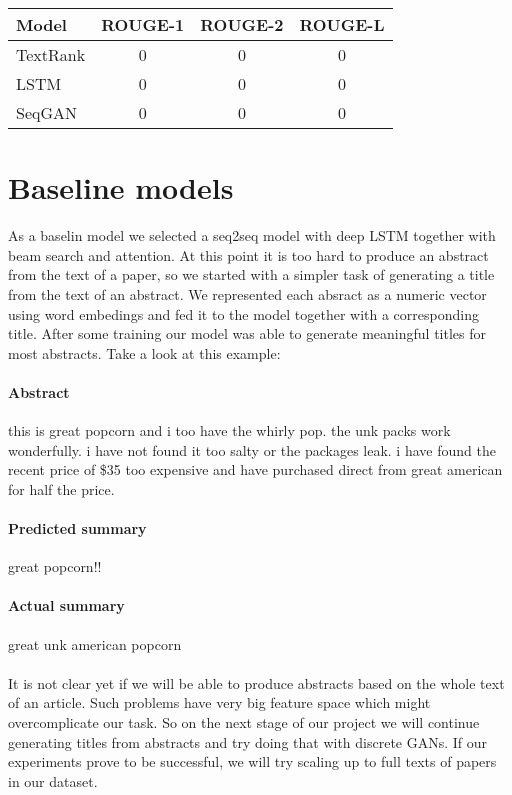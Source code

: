 \documentclass[sigplan]{acmart}
\begin{document}
\begin{tabular}{|l|c|c|c|}
\hline
\textbf{Model} & \textbf{ROUGE-1} & \textbf{ROUGE-2} & \textbf{ROUGE-L} \\
\hline
TextRank & 0 & 0 & 0 \\
LSTM & 0 & 0 & 0 \\
SeqGAN & 0 & 0 & 0 \\
\hline
\end{tabular}

\section{Baseline models}

As a baselin model we selected a seq2seq model with deep LSTM\cite{sutskever-17} together with beam search and attention. At this point it is too hard to produce an abstract from the text of a paper, so we started with a simpler task of generating a title from the text of an abstract. We represented each absract as a numeric vector using word embedings and fed it to the model together with a corresponding title. After some training our model was able to generate meaningful titles for most abstracts. Take a look at this example:

\paragraph{Abstract} this is great popcorn and i too have the whirly pop. the unk packs work wonderfully. i have not found it too salty or the packages leak. i have found the recent price of \$35 too expensive and have purchased direct from great american for half the price.

\paragraph{Predicted summary} great popcorn!!

\paragraph{Actual summary} great unk american popcorn

\paragraph{} It is not clear yet if we will be able to produce abstracts based on the whole text of an article. Such problems have very big feature space which might overcomplicate our task. So on the next stage of our project we will continue generating titles from abstracts and try doing that with discrete GANs. If our experiments prove to be successful, we will try scaling up to full texts of papers in our dataset.
\end{document}
